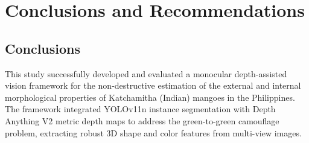 \section{Conclusions and Recommendations}

\subsection{Conclusions}
This study successfully developed and evaluated a monocular depth-assisted vision
framework for the non-destructive estimation of the external and internal morphological
properties of Katchamitha (Indian) mangoes in the Philippines. The framework integrated
YOLOv11n instance segmentation with Depth Anything V2 metric depth maps to address the
green-to-green camouflage problem, extracting robust 3D shape and color features from
multi-view images.

